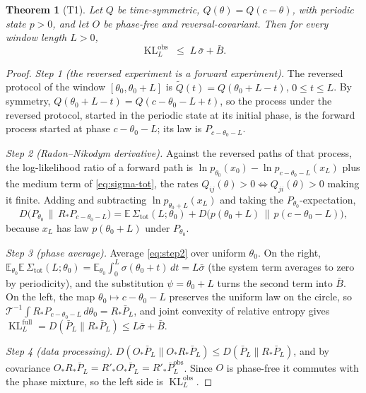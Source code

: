 \documentclass[10pt]{article}
\newtheorem{theorem}{Theorem}[section]
\theoremstyle{definition}
\DeclareMathOperator{\KL}{KL}
\newcommand{\per}{\mathcal T}
\newcommand{\sbar}{\bar\sigma}
\newcommand{\Bbar}{\bar B}
\newcommand{\Pbar}{\bar P}
\newcommand{\Rrec}{R'}
\newcommand{\E}{\mathbb E}
\begin{document}
\begin{theorem}[T1]
\label{thm:T1}
Let $Q$ be time-symmetric, $Q(\theta)=Q(c-\theta)$, with periodic state
$p>0$, and let $O$ be phase-free and reversal-covariant.  Then for every
window length $L>0$,
\begin{equation}
\label{eq:T1}
\KL^{\mathrm{obs}}_L\;\leq\;L\,\sbar+\Bbar .
\end{equation}
\end{theorem}

\begin{proof}
\emph{Step 1 (the reversed experiment is a forward experiment).}  The
reversed protocol of the window $[\theta_0,\theta_0+L]$ is
$\tilde Q(t)=Q(\theta_0+L-t)$, $0\leq t\leq L$.  By symmetry,
$Q(\theta_0+L-t)=Q(c-\theta_0-L+t)$, so the process under the reversed
protocol, started in the periodic state at its initial phase, is the
forward process started at phase $c-\theta_0-L$; its law is
$P_{c-\theta_0-L}$.

\emph{Step 2 (Radon--Nikodym derivative).}  Against the reversed paths of
that process, the log-likelihood ratio of a forward path is
$\ln p_{\theta_0}(x_0)-\ln p_{c-\theta_0-L}(x_L)$ plus the medium term of
\eqref{eq:sigma-tot}, the rates $Q_{ij}(\theta)>0\Leftrightarrow Q_{ji}(\theta)>0$
making it finite.  Adding and subtracting $\ln p_{\theta_0+L}(x_L)$ and
taking the $P_{\theta_0}$-expectation,
\begin{equation}
\label{eq:step2}
D\bigl(P_{\theta_0}\,\big\|\,R_*P_{c-\theta_0-L}\bigr)
=\E\,\Sigma_{\mathrm{tot}}(L;\theta_0)
+D\bigl(p(\theta_0+L)\,\big\|\,p(c-\theta_0-L)\bigr),
\end{equation}
because $x_L$ has law $p(\theta_0+L)$ under $P_{\theta_0}$.

\emph{Step 3 (phase average).}  Average \eqref{eq:step2} over uniform
$\theta_0$.  On the right, $\E_{\theta_0}\E\,\Sigma_{\mathrm{tot}}(L;\theta_0)
=\E_{\theta_0}\int_0^L\sigma(\theta_0+t)\,dt=L\sbar$ (the system term
averages to zero by periodicity), and the substitution
$\psi=\theta_0+L$ turns the second term into $\Bbar$.  On the left, the
map $\theta_0\mapsto c-\theta_0-L$ preserves the uniform law on the
circle, so $\per^{-1}\int R_*P_{c-\theta_0-L}\,d\theta_0=R_*\Pbar_L$, and
joint convexity of relative entropy gives
$\KL^{\mathrm{full}}_L=D(\Pbar_L\|R_*\Pbar_L)\leq L\sbar+\Bbar$.

\emph{Step 4 (data processing).}  $D(O_*\Pbar_L\|O_*R_*\Pbar_L)\leq
D(\Pbar_L\|R_*\Pbar_L)$, and by covariance $O_*R_*\Pbar_L=\Rrec_*O_*\Pbar_L
=\Rrec_*\Pbar^{\mathrm{obs}}_L$.  Since $O$ is phase-free it commutes with
the phase mixture, so the left side is $\KL^{\mathrm{obs}}_L$.
\end{proof}
\end{document}
